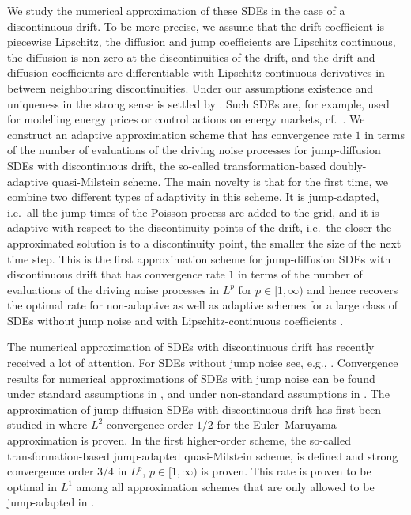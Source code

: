 \documentclass[11pt,a4paper]{article}
\numberwithin{equation}{section}
\theoremstyle{definition}
\begin{document}
We study the numerical approximation of these SDEs in the case of a discontinuous drift. To be more precise, we assume that the drift coefficient is piecewise Lipschitz, the diffusion and jump coefficients are Lipschitz continuous, the diffusion is non-zero at the discontinuities of the drift, and the drift and diffusion coefficients are differentiable with Lipschitz continuous derivatives in between neighbouring discontinuities. Under our assumptions existence and uniqueness in the strong sense is settled by \cite{PS20,PSX21}. Such SDEs are, for example, used for modelling energy prices or control actions on energy markets, cf.~\cite{situ2005,PBL2010,benth2014,SS16, shardin2017}. We construct an adaptive approximation scheme that has convergence rate $1$ in terms of the number of evaluations of the driving noise processes for jump-diffusion SDEs with discontinuous drift, the so-called transformation-based doubly-adaptive quasi-Milstein scheme. The main novelty is that for the first time, we combine two different types of adaptivity in this scheme. It is jump-adapted, i.e.~all the jump times of the Poisson process are added to the grid, and it is adaptive with respect to the discontinuity points of the drift, i.e.~the closer the approximated solution is to a discontinuity point, the smaller the size of the next time step. This is the first approximation scheme for jump-diffusion SDEs with discontinuous drift that has convergence rate $1$ in terms of the number of evaluations of the driving noise processes in $L^p$ for $p\in[1,\infty)$ and hence recovers the optimal rate for non-adaptive as well as adaptive schemes for a large class of SDEs without jump noise and with Lipschitz-continuous coefficients \cite{mullergronbach2002,mullergronbach2004}. 

The numerical approximation of SDEs with discontinuous drift has recently received a lot of attention. For SDEs without jump noise see, e.g., \cite{halidias2006,halidias2008,gyongy2011,LS16,ngo2016,LS17,ngo2017a,ngo2017b,pamen2017,LS18,hefter2019,muellergronbach2019,muellergronbach2019b,NSS19,Dareiotis2020,MuellerGronbach2023,Neuenkirch2021,Butkovsky2021,Dareiotis2023,Yaroslavtseva2022,Mullergronbach2022,Hu2022, ellinger2024sharp, ellinger2024optimal, muller2025performance}.
Convergence results for numerical approximations of SDEs with jump noise can be found under standard assumptions in  \cite{Gardon2004,Gardon2006,PBL2010,buckwar2011}, and under non-standard assumptions in \cite{Higham2005,Higham2006,Higham2007,dareiotis2016,Przybylowicz2016,Kaluza2018,Deng2019a,Deng2019b,Tambue2019,Przybylowicz2019a,Przybylowicz2019b,Chen2020,Liu2020,Butkovsky2022,Kieu2022,Nasroallah2022,Przybylowicz2022,Kaluza2022,przybylowicz2024randomized,kelly2025strong}. The approximation of jump-diffusion SDEs with discontinuous drift has first been studied in \cite{PS20} where $L^2$-convergence order $1/2$ for the Euler--Maruyama approximation is proven. In \cite{PSS2024JMS} the first higher-order scheme, the so-called transformation-based jump-adapted quasi-Milstein scheme, is defined and strong convergence order $3/4$ in $L^p$, $p\in[1,\infty)$ is proven. This rate is proven to be optimal in $L^1$ among all approximation schemes that are only allowed to be jump-adapted in \cite{przybylowicz2024lower}.
\end{document}
